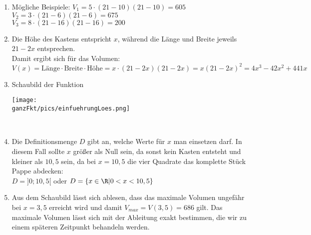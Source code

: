 \begin{enumerate}[label=\alph*)]
	\item Mögliche Beispiele: \(V_1=5\cdot \left(21-10\right)\left(21-10\right)=605\)\\
	\hphantom{Mögliche Beispiele: }\(V_2=3\cdot \left(21-6\right)\left(21-6\right)=675\)\\
	\hphantom{Mögliche Beispiele: }\(V_3=8\cdot \left(21-16\right)\left(21-16\right)=200\)
	\item Die Höhe des Kastens entspricht \(x\), während die Länge und Breite jeweils \(21-2x\) entsprechen.\\
	Damit ergibt sich für das Volumen:\\
	\(V(x)=\text{Länge}\cdot \text{Breite}\cdot \text{Höhe}=x\cdot \left(21-2x\right)\left(21-2x\right)=x\left(21-2x\right)^2=4x^3-42x^2+441x\)
	\item
	Schaubild der Funktion\\
	\begin{minipage}{\linewidth}
		\texttt{[image: \\ganzFkt/pics/einfuehrungLoes.png]}
	\end{minipage}\\
	\item Die Definitionsmenge \(D\) gibt an, welche Werte für \(x\) man einsetzen darf. In diesem Fall sollte \(x\) größer als Null sein, da sonst kein Kasten entsteht und kleiner als \(10,5\) sein, da bei \(x=10,5\) die vier Quadrate das komplette Stück Pappe abdecken:\\
	\(D=]0;10,5[\) oder \(D=\{x\in\R \vert 0< x < 10,5\}\)
	\item Aus dem Schaubild lässt sich ablesen, dass das maximale Volumen ungefähr bei \(x=3,5\) erreicht wird und damit  \(V_{max}=V(3,5)=686\) gilt. Das maximale Volumen lässt sich mit der Ableitung exakt bestimmen, die wir zu einem späteren Zeitpunkt behandeln werden.
\end{enumerate}